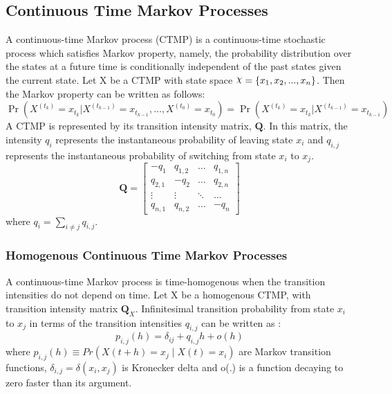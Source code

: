 \subsection{Continuous Time Markov Processes}
A continuous-time Markov process (CTMP) is a continuous-time stochastic process which satisfies Markov property, namely, the probability distribution over the states at a future time is conditionally independent of the past states given the current state.\cite{Cohn2010a} Let X be a CTMP with state space $ \rchi = \left\lbrace x_{1}, x_{2}, ..., x_{n} \right\rbrace  $. Then the Markov property can be written as follows:
\begin{equation}
	\operatorname{Pr}\left(X^{\left(t_{k}\right)}=x_{t_{k}} | X^{\left(t_{k-1}\right)}=x_{t_{k-1}}, \ldots, X^{\left(t_{0}\right)}=x_{t_{0}}\right)=\operatorname{Pr}\left(X^{\left(t_{k}\right)}=x_{t_{k}} | X^{\left(t_{k-1}\right)}=x_{t_{k-1}}\right)
\end{equation}
A CTMP is represented by its transition intensity matrix, $ \textbf{Q} $. In this matrix, the intensity $ q_{i} $ represents the instantaneous probability of leaving state $ x_{i} $ and $ q_{i,j} $ represents the instantaneous probability of switching from state $ x_{i} $ to $ x_{j} $. 
\begin{equation}
	\textbf{Q} = 
	\begin{bmatrix}
	-q_{1} & q_{1,2} & 	{\hdots}  & q_{1,n} \\
	q_{2,1} & -q_{2} & 	{\hdots}  & q_{2,n}  \\
	{\vdots}  & 	{\vdots}  & 	{\ddots}  & {\hdots}  \\
	q_{n,1} &  q_{n,2} &  {\hdots} & -q_{n}
	\end{bmatrix}
\label{eq:Q_matrix}
\end{equation}
where $ q_{i} = \sum_{i \neq j} q_{i,j}$.\cite{Nodelman1995}

\subsubsection{Homogenous Continuous Time Markov Processes}
A continuous-time Markov process is time-homogenous when the transition intensities do not depend on time. Let X be a homogenous CTMP, with transition intensity matrix $ \textbf{Q}_X $. Infinitesimal transition probability from state $ x_{i} $ to $ x_{j} $ in terms of the transition intensities $ q_{i,j} $ can be written as \cite{Cohn2010a}:
\begin{equation}
p_{i,j}(h)=\delta_{ij}+q_{i,j} h+o(h)
\label{eq:Markov_trans_func}
\end{equation}
where $ p_{i, j}(h) \equiv Pr(X(t+h)=x_j\mid X(t)=x_i) $ are Markov transition functions, $ \delta_{i,j} = \delta(x_i,x_j)$ is Kronecker delta and o(.) is a function decaying to zero faster than its argument.

